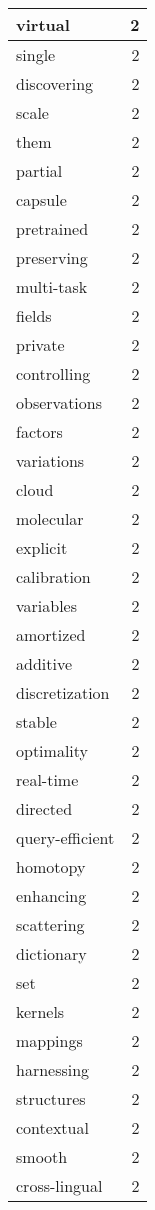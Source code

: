 \begin{table}[h]
\begin{tabular}{|l|r|}
\hline
virtual & 2 \\
\hline
single & 2 \\
\hline
discovering & 2 \\
\hline
scale & 2 \\
\hline
them & 2 \\
\hline
partial & 2 \\
\hline
capsule & 2 \\
\hline
pretrained & 2 \\
\hline
preserving & 2 \\
\hline
multi-task & 2 \\
\hline
fields & 2 \\
\hline
private & 2 \\
\hline
controlling & 2 \\
\hline
observations & 2 \\
\hline
factors & 2 \\
\hline
variations & 2 \\
\hline
cloud & 2 \\
\hline
molecular & 2 \\
\hline
explicit & 2 \\
\hline
calibration & 2 \\
\hline
variables & 2 \\
\hline
amortized & 2 \\
\hline
additive & 2 \\
\hline
discretization & 2 \\
\hline
stable & 2 \\
\hline
optimality & 2 \\
\hline
real-time & 2 \\
\hline
directed & 2 \\
\hline
query-efficient & 2 \\
\hline
homotopy & 2 \\
\hline
enhancing & 2 \\
\hline
scattering & 2 \\
\hline
dictionary & 2 \\
\hline
set & 2 \\
\hline
kernels & 2 \\
\hline
mappings & 2 \\
\hline
harnessing & 2 \\
\hline
structures & 2 \\
\hline
contextual & 2 \\
\hline
smooth & 2 \\
\hline
cross-lingual & 2 \\

\end{tabular}
\end{table}
